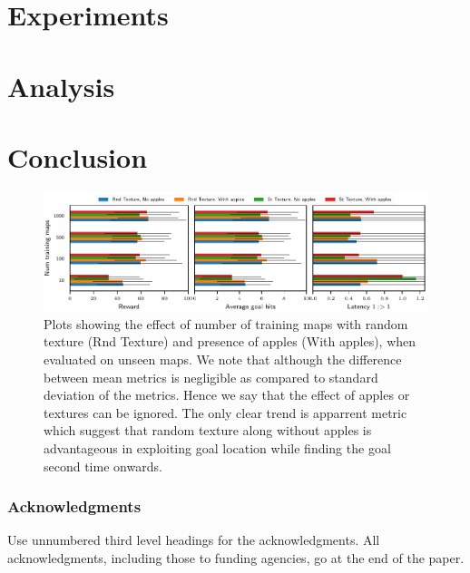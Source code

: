 \documentclass{article} %
\begin{document}
\section{Experiments}


\section{Analysis}


\section{Conclusion}


\begin{figure}%
  \includegraphics[width=\linewidth]{images/plot_ntrain_summary.pdf}%
  \vspace{-1em}%
  \caption{Plots showing the effect of number of training maps with random texture (Rnd Texture) and presence of apples (With apples), when evaluated on unseen maps. We note that although the difference between mean metrics is negligible as compared to standard deviation of the metrics. Hence we say that the effect of apples or textures can be ignored.
  The only clear trend is apparrent \LatencyOneGtOne{} metric which suggest that random texture along without apples is advantageous in exploiting goal location while finding the goal second time onwards.}
  \label{fig:num-training-maps}
\end{figure}

\subsubsection*{Acknowledgments}

Use unnumbered third level headings for the acknowledgments. All
acknowledgments, including those to funding agencies, go at the end of the paper.

{\small
{}

}
\end{document}
